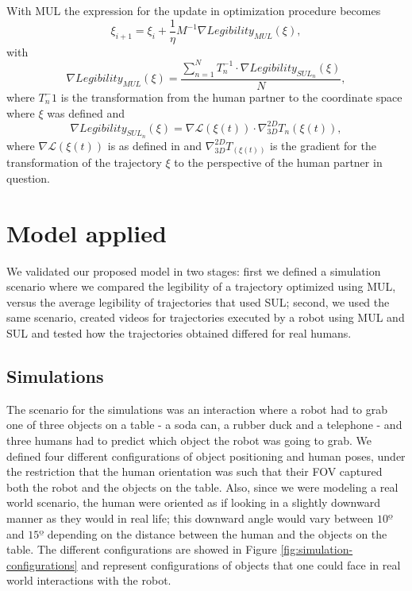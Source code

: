 \documentclass[letterpaper, 10 pt, conference]{ieeeconf}
\begin{document}
With \ac{MUL} the expression for the update in optimization procedure becomes
%
\begin{equation}
    \label{eq:5}
    \xi_{i+1} = \xi_i + \frac{1}{\eta} M^{-1} \nabla Legibility_{MUL}(\xi),
\end{equation}
%
with 
%
\begin{equation}
    \label{eq:6}
    \nabla Legibility_{MUL}(\xi) = \frac{ \sum_{n=1}^{N} T_n^{-1} \cdot \nabla Legibility_{SUL_n}(\xi)}{N},
\end{equation}
%
where $T_n^-1$ is the transformation from the human partner to the coordinate space where $\xi$ was defined and
%
\begin{equation}
    \label{eq:7}
    \nabla Legibility_{SUL_n}(\xi) = \nabla \mathcal{L}(\xi(t)) \cdot \nabla_{3D}^{2D} T_n(\xi(t)),
\end{equation}
%
where $\nabla \mathcal{L}(\xi(t))$ is as defined in \cite{dragan2013generating} and $\nabla_{3D}^{2D} T_(\xi(t))$ is the gradient for the transformation of the trajectory $\xi$ to the perspective of the human partner in question.


\section{Model applied}
\label{sec:experiments}

We validated our proposed model in two stages: first we defined a simulation scenario where we compared the legibility of a trajectory optimized using \ac{MUL}, versus the average legibility of trajectories that used \ac{SUL}; second, we used the same scenario, created videos for trajectories executed by a robot using \ac{MUL} and \ac{SUL} and tested how the trajectories obtained differed for real humans.

\subsection{Simulations}
\label{subsec:simulations}

The scenario for the simulations was an interaction where a robot had to grab one of three objects on a table - a soda can, a rubber duck and a telephone - and three humans had to predict which object the robot was going to grab. We defined four different configurations of object positioning and human poses, under the restriction that the human orientation was such that their \ac{FOV} captured both the robot and the objects on the table. Also, since we were modeling a real world scenario, the human were oriented as if looking in a slightly downward manner as they would in real life; this downward angle would vary between $10º$ and $15º$ depending on the distance between the human and the objects on the table. The different configurations are showed in Figure \ref{fig:simulation-configurations} and represent configurations of objects that one could face in real world interactions with the robot.
\end{document}
